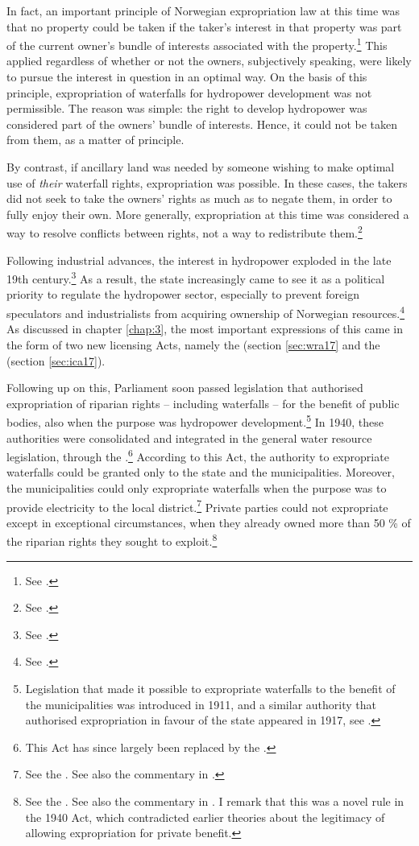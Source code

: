 In fact, an important principle of Norwegian expropriation law at this time was that no property could be taken if the taker's interest in that property was part of the current owner's bundle of interests associated with the property.\footnote{See \cite[168-170]{dahl88}.} This applied regardless of whether or not the owners, subjectively speaking, were likely to pursue the interest in question in an optimal way. On the basis of this principle, expropriation of waterfalls for hydropower development was not permissible. The reason was simple: the right to develop hydropower was considered part of the owners' bundle of interests. Hence, it could not be taken from them, as a matter of principle.

By contrast, if ancillary land was needed by someone wishing to make optimal use of {\it their} waterfall rights, expropriation was possible. In these cases, the takers did not seek to take the owners' rights as much as to negate them, in order to fully enjoy their own. More generally, expropriation at this time was considered a way to resolve conflicts between rights, not a way to redistribute them.\footnote{See \cite[168-170]{dahl88}.}

Following industrial advances, the interest in hydropower exploded in the late 19th century.\footnote{See \cite[58-59]{falkanger87}.} As a result, the state increasingly came to see it as a political priority to regulate the hydropower sector, especially to prevent foreign speculators and industrialists from acquiring ownership of Norwegian resources.\footnote{See \cite[58-59]{falkanger87}.} As discussed in chapter \ref{chap:3}, the most important expressions of this came in the form of two new licensing Acts, namely the \cite{wra17} (section \ref{sec:wra17} and the \cite{ica17} (section \ref{sec:ica17}).

Following up on this, Parliament soon passed legislation that authorised expropriation of riparian rights -- including waterfalls -- for the benefit of public bodies, also when the purpose was hydropower development.\footnote{Legislation that made it possible to expropriate waterfalls to the benefit of the municipalities was introduced in 1911, and a similar authority that authorised expropriation in favour of the state appeared in 1917, see \cite[29]{amundsen28}.} In 1940, these authorities were consolidated and integrated in the general water resource legislation, through the \cite{wra40}.\footnote{This Act has since largely been replaced by the \cite{wra00}.} According to this Act, the authority to expropriate waterfalls could be granted only to the state and the municipalities. Moreover, the municipalities could only expropriate waterfalls when the purpose was to provide electricity to the local district.\footnote{See the \dni\cite[148]{wra40}. See also the commentary in \cite[201-210]{sorensen41}.} Private parties could not expropriate except in exceptional circumstances, when they already owned more than 50 \% of the riparian rights they sought to exploit.\footnote{See the \dni\cite[55]{wra40}. See also the commentary in \cite[70-74]{sorensen41}. I remark that this was a novel rule in the 1940 Act, which contradicted earlier theories about the legitimacy of allowing expropriation for private benefit.} 

